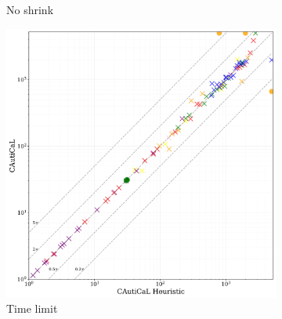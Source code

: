 \begin{figure}[!t]
\begin{subfigure}[t]{0.3\textwidth}
            \caption{No shrink}
            \label{fig:cautical-vs-cadical}
    \end{subfigure}
    \begin{subfigure}[t]{0.3\textwidth}
        \centering
        \includegraphics[width=\textwidth]{figs/global_time_lim_heuristic_comparison.jpg}
        \caption{Time limit}
        \label{fig:global-time-comparison}
    \end{subfigure}
    \begin{subfigure}[t]{0.3\textwidth}
        \centering

\end{subfigure}
\end{figure}
